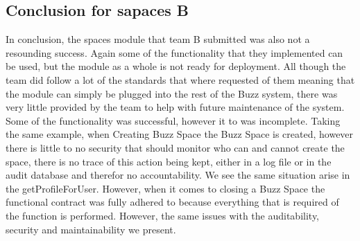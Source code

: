 \subsection{Conclusion for sapaces B}
In conclusion, the spaces module that team B submitted was also not a resounding success. Again some of the functionality that they implemented can be used, but the module as a whole is not ready for deployment. All though the team did follow a lot of the standards that where requested of them meaning that the module can simply be plugged into the rest of the Buzz system, there was very little provided by the team to help with future maintenance of the system. Some of the functionality was successful, however it to was incomplete. Taking the same example, when Creating Buzz Space the Buzz Space is created, however there is little to no security that should monitor who can and cannot create the space, there is no trace of this action being kept, either in a log file or in the audit database and therefor no accountability. We see the same situation arise in the getProfileForUser. However, when it comes to closing a Buzz Space the functional contract was fully adhered to because everything that is required of the function is performed. However, the same issues with the auditability, security and maintainability we present.